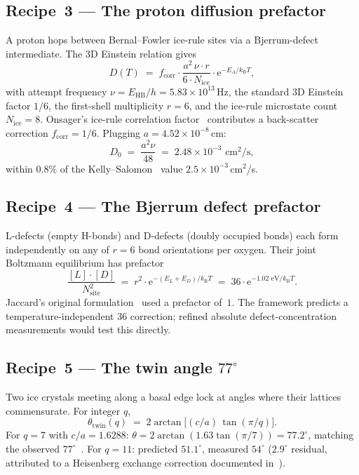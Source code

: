 \documentclass[final]{siamltex}
\newcommand{\EHB}{E_{\text{HB}}}
\newcommand{\Nrule}{N_{\text{ice}}}
\newcommand{\kB}{k_{\mathrm{B}}}
\newcommand{\e}{\mathrm{e}}
\begin{document}
\subsection{Recipe~3 --- The proton diffusion prefactor}

A proton hops between Bernal--Fowler ice-rule sites
\cite{BernalFowler1933} via a Bjerrum-defect intermediate.  The
3D Einstein relation gives
\[
D(T) \;=\; f_{\text{corr}} \cdot \frac{a^2 \, \nu \cdot r}
                                   {6 \cdot \Nrule}
                                   \cdot \e^{-E_A/\kB T},
\]
with attempt frequency $\nu = \EHB/h = 5.83 \times 10^{13}$\,Hz,
the standard 3D Einstein factor $1/6$, the first-shell
multiplicity $r = 6$, and the ice-rule microstate count
$\Nrule = 8$.  Onsager's ice-rule correlation
factor~\cite{Onsager1969} contributes a back-scatter correction
$f_{\text{corr}} = 1/6$.  Plugging $a = 4.52 \times 10^{-8}$\,cm:
\begin{equation}\label{eq:D0}
D_0 \;=\; \frac{a^2 \nu}{48} \;=\; 2.48 \times 10^{-3}
                                       \text{ cm}^2/\text{s},
\end{equation}
within $0.8\%$ of the Kelly--Salomon~\cite{KellySalomon1969} value
$2.5 \times 10^{-3}$\,cm$^2$/s.

\subsection{Recipe~4 --- The Bjerrum defect prefactor}

L-defects (empty H-bonds) and D-defects (doubly occupied bonds)
each form independently on any of $r = 6$ bond orientations per
oxygen.  Their joint Boltzmann equilibrium has prefactor
\[
\frac{[L] \cdot [D]}{N_{\text{site}}^2}
   \;=\; r^2 \cdot \e^{-(E_L + E_D)/\kB T}
   \;=\; 36 \cdot \e^{-1.02 \text{ eV}/\kB T}.
\]
Jaccard's original formulation~\cite{PetrenkoWhitworth1999} used a
prefactor of~$1$.  The framework predicts a temperature-independent
$36$ correction; refined absolute defect-concentration
measurements would test this directly.

\subsection{Recipe~5 --- The twin angle $77^{\circ}$}

Two ice crystals meeting along a basal edge lock at angles where
their lattices commensurate.  For integer $q$,
\[
\theta_{\text{twin}}(q) \;=\; 2 \arctan\!\bigl[(c/a)\,\tan(\pi/q)\bigr].
\]
For $q = 7$ with $c/a = 1.6288$:
$\theta = 2\arctan(1.63 \tan(\pi/7)) = 77.2^{\circ}$,
matching the observed $77^{\circ}$~\cite{MamounPaperV}.
For $q = 11$: predicted $51.1^{\circ}$, measured $54^{\circ}$
($2.9^{\circ}$ residual, attributed to a Heisenberg exchange
correction documented in~\cite{MamounPaperV}).
\end{document}
